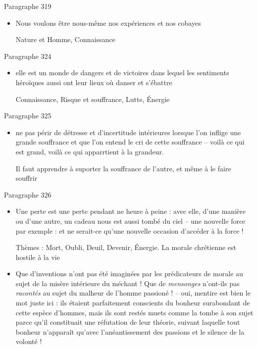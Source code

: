 \documentclass[french,a4paper,11pt,answers]{exam}
\newcommand{\cit}[2]{\og #1 \fg{} \begin{solution}{ #2 }\end{solution}} %
\begin{document}
	\begin{cadre}{Paragraphe 319}
		\begin{itemize}
			\item \cit{Nous voulons être nous-même nos expériences et nos cobayes}
				{Nature et Homme, Connaissance}
		\end{itemize}
	\end{cadre}
	
	\begin{cadre}{Paragraphe 324}
		\begin{itemize}
			\item \cit{elle est un monde de dangers et de victoires dans lequel les sentiments héroïques aussi ont leur lieux où danser et s'ébattre}
				{Connaissance, Risque et souffrance, Lutte, Énergie}
		\end{itemize}
	\end{cadre}

	\begin{cadre}{Paragraphe 325}
		\begin{itemize}
			\item \cit{ne pas périr de détresse et d'incertitude intérieures lorsque l'on inflige une grande souffrance et que l'on entend le cri de cette souffrance -- voilà ce qui est grand, voilà ce qui apparrtient à la grandeur.}
				{Il faut apprendre à suporter la souffrance de l'autre, et même à le faire souffrir}
		\end{itemize}
	\end{cadre}
	
	\begin{cadre}{Paragraphe 326}
		\begin{itemize}
			\item \cit{Une perte est une perte pendant ne heure à peine : avec elle, d'une manière ou d'une autre, un cadeau nous est aussi tombé du ciel -- une nouvelle force par exemple : et ne serait-ce qu'une nouvelle occasion d'accéder à la force !}
				{Thèmes : Mort, Oubli, Deuil, Devenir, Énergie. La morale chrétienne est hostile à la vie}
			\item \cit{Que d'inventions n'ont pas été imaginées par les prédicateurs de morale au sujet de la \og misère \fg{} intérieure du méchant ! Que de \emph{mensonges} n'ont-ils pas \emph{racontés} au sujet du malheur de l'homme passioné ! -- oui, mentire est bien le mot juste ici : ils étaient parfaitement conscients du bonheur surabondant de cette espèce d'hommes, mais ils sont restés muets comme la tombe à son sujet parce qu'il constituait une réfutation de leur théorie, suivant laquelle tout bonheur n'apparaît qu'avec l'anéantissement des passions et le silence de la volonté !}
				{}
		\end{itemize}
	\end{cadre}
\end{document}
